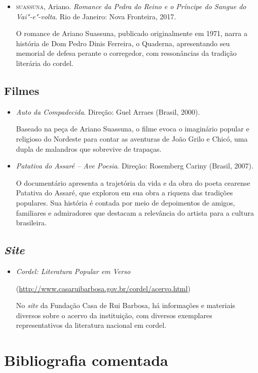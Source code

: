 \documentclass[12pt]{extarticle}
\begin{document}
{\begin{itemize}
\item\textsc{suassuna}, Ariano. \textit{Romance da Pedra do Reino e o Príncipe do
  Sangue do Vai"-e"-volta}. Rio de Janeiro: Nova Fronteira, 2017.


O romance de Ariano Suassuna, publicado originalmente em 1971, narra a
história de Dom Pedro Dinis Ferreira, o Quaderna, apresentando seu
memorial de defesa perante o corregedor, com ressonâncias da tradição
literária do cordel.
\end{itemize}

\subsection{Filmes}
\begin{itemize}
\item\textit{Auto da Compadecida}. Direção: Guel Arraes (Brasil, 2000).

Baseado na peça de Ariano Suassuna, o filme evoca o imaginário popular e
religioso do Nordeste para contar as aventuras de João Grilo e Chicó,
uma dupla de malandros que sobrevive de trapaças.

\item\textit{Patativa do Assaré -- Ave Poesia}. Direção: Rosemberg Cariny (Brasil, 2007).

O documentário apresenta a trajetória da vida e da obra do poeta
cearense Patativa do Assaré, que explorou em sua obra a riqueza das
tradições populares. Sua história é contada por meio de depoimentos de
amigos, familiares e admiradores que destacam a relevância do artista
para a cultura brasileira.
\end{itemize}

\subsection{\emph{Site}}

\begin{itemize}
\item\textit{Cordel: Literatura Popular em Verso}

(\url{http://www.casaruibarbosa.gov.br/cordel/acervo.html})

No \emph{site} da Fundação Casa de Rui Barbosa, há informações e
materiais diversos sobre o acervo da instituição, com diversos
exemplares representativos da literatura nacional em cordel.
\end{itemize}

\section{Bibliografia comentada}

}
\end{document}
